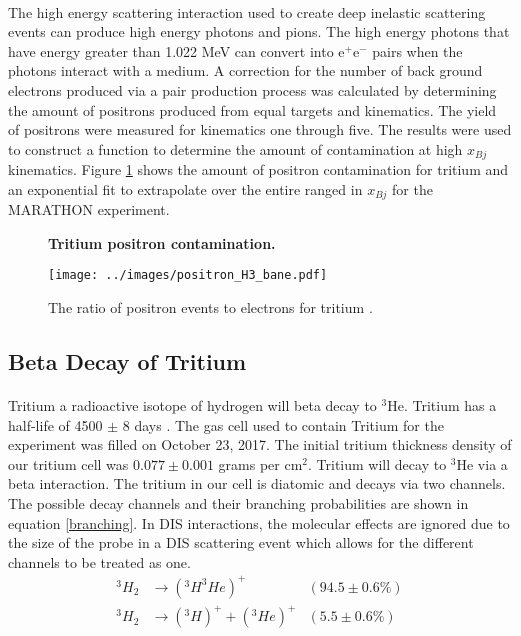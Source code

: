 \paragraph{} The high energy scattering interaction used to create deep inelastic scattering events can produce high energy photons and pions. The high energy photons that have energy greater than 1.022 MeV can convert into e$^+$e$^-$ pairs when the photons interact with a medium. A correction for the number of back ground electrons produced via a pair production process was calculated by determining the amount of positrons produced from equal targets and kinematics. The yield of positrons were measured for kinematics one through five. The results were used to construct a function to determine the amount of contamination at high $x_{Bj}$ kinematics. Figure \ref{PC} shows the amount of positron contamination for tritium and an exponential fit to extrapolate over the entire ranged in $x_{Bj}$ for the MARATHON experiment. 

\begin{figure}[h]
	\centering
	\textbf{Tritium positron contamination. }\par\medskip
	\texttt{[image: ../images/positron\_H3\_bane.pdf]}
	\caption{The ratio of positron events to electrons for tritium \cite{tongsu}. }
	\label{PC}
\end{figure}

\subsection{Beta Decay of Tritium}
\paragraph{} Tritium a radioactive isotope of hydrogen will beta decay to $^3$He. Tritium has a half-life of 4500 $\pm$ 8 days \cite{T2HL}. The gas cell used to contain Tritium for the experiment was filled on October 23, 2017. The initial tritium thickness density of our tritium cell was $0.077 \pm 0.001 $ grams per cm$^2$. Tritium will decay to $^3$He via a beta interaction. The tritium in our cell is diatomic and decays via two channels\cite{diaT}. The possible decay channels and their branching probabilities are shown in equation \ref{branching}. In DIS interactions, the molecular effects are ignored due to the size of the probe in a DIS scattering event which allows for the different channels to be treated as one. 
\begin{align}
			^3H_2 &\rightarrow(^3H ^3He)^+  &(94.5 \pm 0.6\%) \nonumber \\ 
			^3H_2 &\rightarrow(^3H)^+ + (^3He)^+  & (5.5 \pm 0.6\%) 
			\label{branching}
\end{align}
